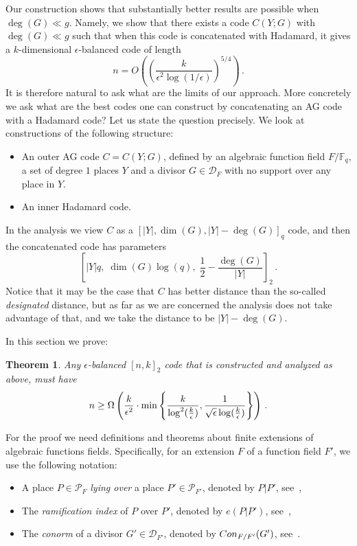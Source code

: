 \documentclass[10pt]{article}
\newtheorem{theorem}{Theorem}[section]
\theoremstyle{definition}
\numberwithin{equation}{section}
\newcommand{\cD}{\mathcal{D}}
\newcommand{\Fq}{{\mathbb{F}_q}}
\newcommand{\half}{\frac{1}{2}}
\newcommand{\eps}{\epsilon}
\newcommand{\logepsk}{\log({k \over \epsilon})}
\newcommand{\set}[1]{{\left\{#1\right\}}}
\newcommand{\logepsksquare}{\log^2({k \over \epsilon})}
\newcommand{\AllPl}{{\mathcal{P}}}
\newcommand{\Pl}{{Y}}
\newcommand{\con}{{\rm Con}}
\begin{document}
Our construction shows that substantially better results are
possible when $\deg(G) \ll g$. Namely, we show that there exists a
code $C(Y;G)$ with $\deg(G) \ll g$ such that when this code is
concatenated with Hadamard, it gives a 
%
$k$-dimensional
$\eps$-balanced code of length 
\[
n=O\left(\left(\frac{k}{\eps^2
\log(1/\eps)}\right)^{5/4}\right)\,.
\]
It is therefore natural to ask what
are the limits of our approach. More concretely we ask what are the
best codes one can construct by concatenating an AG code with a
Hadamard code? Let us state the question precisely. We look at
constructions of the following structure:

\begin{itemize}
\item
An outer AG code $C=C(\Pl;G)$, defined by an algebraic function
field $F/\Fq$, a set of degree $1$ places $\Pl$ and a divisor $G \in
\cD_F$ with no support over any place in $\Pl$.

\item An inner Hadamard code.
\end{itemize}

In the analysis we view $C$ as a $[|\Pl|,\dim(G),|Y|-\deg(G)]_q$
code, and then the concatenated code has parameters
\[
\left[|Y|
q,\; \dim(G) \log(q),\; \half-\frac{\deg(G)}{|Y|}\right]_2\,.
\]
 Notice that it may
be the case that $C$ has better distance than the so-called
\emph{designated} distance, but as far as we are concerned the
analysis does not take advantage of that, and we take the distance
to be $|Y|-\deg(G)$.

In this section we prove:
\begin{theorem}
\label{thm:lower} Any $\eps$-balanced $[n,k]_2$ code that is
constructed and analyzed as above, must have
$$n \ge \Omega\left(\frac{k}{\eps^2} \cdot \min\set{\frac{k}{\logepsksquare},\frac{1}{\sqrt{\eps} \logepsk}}\right)\,.$$
\end{theorem}


For the proof we need definitions and theorems about finite
extensions of algebraic functions fields. Specifically, for an
extension $F$ of a function field $F'$, we use the following
notation:

\begin{itemize}
\item
A place $P \in \AllPl_{F}$ \emph{lying over} a place $P' \in \AllPl_{F'}$,
denoted by $P|P'$, see~\cite[Def III.1.3]{S:93},
\item
The \emph{ramification index} of $P$ over $P'$, denoted by $e(P|P')$, see~\cite[Def III.1.5]{S:93},
\item
The \emph{conorm} of a divisor $G' \in \cD_{F'}$, denoted by
$\con_{F/F'}(G')$, see~\cite[Def III.1.8]{S:93}.
\end{itemize}
\end{document}
